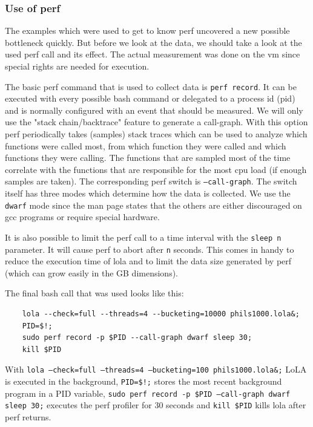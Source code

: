 \subsubsection{Use of perf}
The examples which were used to get to know perf uncovered a new possible bottleneck quickly. But before we look at the data, we should take a look at the used perf call and its effect. The actual measurement was done on the vm since special rights are needed for execution.

The basic perf command that is used to collect data is \texttt{perf record}. It can be executed with every possible bash command or delegated to a process id (pid) and is normally configured with an event that should be measured. We will only use the "stack chain/backtrace" feature to generate a call-graph. With this option perf periodically takes (samples) stack traces which can be used to analyze which functions were called most, from which function they were called and which functions they were calling. The functions that are sampled most of the time correlate with the functions that are responsible for the most cpu load (if enough samples are taken). The corresponding perf switch is \texttt{--call-graph}. The switch itself has three modes which determine how the data is collected. We use the \texttt{dwarf} mode since the man page states that the others are either discouraged on gcc programs or require special hardware.

It is also possible to limit the perf call to a time interval with the \texttt{sleep n} parameter. It will cause perf to abort after \texttt{n} seconds. This comes in handy to reduce the execution time of lola and to limit the data size generated by perf (which can grow easily in the GB dimensions).

The final bash call that was used looks like this:
\begin{lstlisting}
    lola --check=full --threads=4 --bucketing=10000 phils1000.lola&;
    PID=$!;
    sudo perf record -p $PID --call-graph dwarf sleep 30;
    kill $PID
\end{lstlisting}
With \texttt{lola --check=full --threads=4 --bucketing=100 phils1000.lola\&;} LoLA  is executed in the background, \texttt{PID=\$!;} stores the most recent background program in a PID variable, \texttt{sudo perf record -p \$PID --call-graph dwarf sleep 30;} executes the perf profiler for 30 seconds and \texttt{kill \$PID} kills lola after perf returns.

